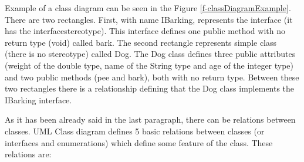 Example of a class diagram can be seen in the Figure \ref{f-classDiagramExample}. There are two rectangles. First, with name IBarking, represents the interface (it has the \guillemotleft{}interface\guillemotright stereotype). This interface defines one public method with no return type (void) called bark. The second rectangle represents simple class (there is no stereotype) called Dog. The Dog class defines three public attributes (weight of the double type, name of the String type and age of the integer type) and two public methods (pee and bark), both with no return type. Between these two rectangles there is a relationship defining that the Dog class implements the IBarking interface.

As it has been already said in the last paragraph, there can be relations between classes. UML Class diagram defines 5 basic relations between classes (or interfaces and enumerations) which define some feature of the class. These relations are:

